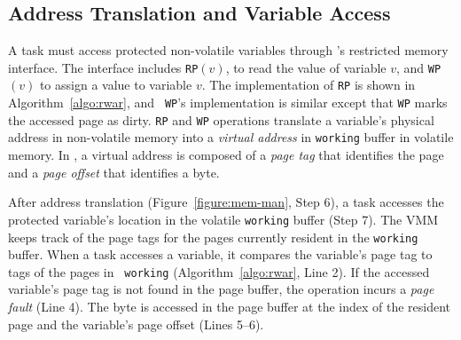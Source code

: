 \subsection{Address Translation and Variable Access}
%
A task must access protected non-volatile variables through \sys's
restricted memory interface. The interface includes \texttt{RP}$(v)$, to read the value of variable
$v$, and \texttt{WP}$(v)$ to assign a value to variable $v$. The
implementation of {\tt RP} is shown in Algorithm~\ref{algo:rwar}, and {\tt
WP}'s implementation is similar except that {\tt WP} marks the accessed page as
dirty.
%
{\tt RP} and {\tt WP} operations translate a variable's physical address in
non-volatile memory into a \emph{virtual address} in \texttt{working} buffer in
volatile memory. In \sys, a virtual address is composed of a \emph{page tag}
that identifies the page and a \emph{page offset} that identifies a byte.
%
\begin{figure}
\end{figure}
%
After address translation (Figure~\ref{figure:mem-man}, Step 6), a task
accesses the protected variable's location in the volatile \texttt{working} buffer
(Step 7). The VMM keeps track of the page tags for
the pages currently resident in the \texttt{working} buffer. When a task accesses a
variable, it compares the variable's page tag to tags of the pages in {\tt
working} (Algorithm~\ref{algo:rwar}, Line 2).
%
If the accessed variable's page tag is not found in the page buffer, the
operation incurs a {\em page fault} (Line 4).
%
The byte is accessed in the page buffer at the index of the resident page and
the variable's page offset (Lines 5--6).
%
